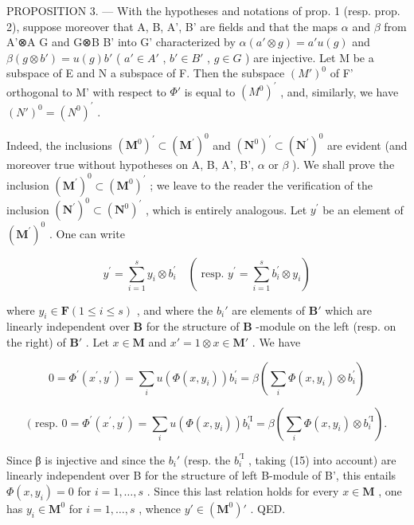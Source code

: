 PROPOSITION 3. --- With the hypotheses and notations of prop. 1 (resp. prop. 2), suppose moreover that A, B, A', B' are fields and that the maps \(\alpha\) and \(\beta\) from A'⊗A G and G⊗B B' into G' characterized by \(\alpha(a'\otimes g)=a'u(g)\) and \(\beta(g\otimes b')=u(g)b'\) ( \(a'\in A'\) , \(b'\in B'\) , \(g\in G\) ) are injective. Let M be a subspace of E and N a subspace of F. Then the subspace \((M')^{0}\) of F' orthogonal to M' with respect to \(\Phi'\) is equal to \((M^{0})^{\prime}\) , and, similarly, we have \((N')^{0} = (N^{0})^{\prime}\) .

Indeed, the inclusions \((\mathbf{M}^{0})^{\prime}\subset(\mathbf{M}^{\prime})^{0}\) and \((\mathbf{N}^{0})^{\prime}\subset(\mathbf{N}^{\prime})^{0}\) are evident (and moreover true without hypotheses on A, B, A', B', \(\alpha\) or \(\beta\) ). We shall prove the inclusion \((\mathbf{M}^{\prime})^{0}\subset(\mathbf{M}^{0})^{\prime}\) ; we leave to the reader the verification of the inclusion \((\mathbf{N}^{\prime})^{0}\subset(\mathbf{N}^{0})^{\prime}\) , which is entirely analogous. Let \(y^{\prime}\) be an element of \((\mathbf{M}^{\prime})^{0}\) . One can write

\[
y ^ {\prime} = \sum_ {i = 1} ^ {s} y _ {i} \otimes b _ {i} ^ {\prime} \quad (\text { resp. } y ^ {\prime} = \sum_ {i = 1} ^ {s} b _ {i} ^ {\prime} \otimes y _ {i})
\]

where \(y_i \in \mathbf{F} (1 \leqslant i \leqslant s)\) , and where the \(b_i'\) are elements of \(\mathbf{B}'\) which are linearly independent over \(\mathbf{B}\) for the structure of \(\mathbf{B}\) -module on the left (resp. on the right) of \(\mathbf{B}'\) . Let \(x \in \mathbf{M}\) and \(x' = 1 \otimes x \in \mathbf{M}'\) . We have

\[
0 = \Phi^ {\prime} (x ^ {\prime}, y ^ {\prime}) = \sum_ {i} u (\Phi (x, y _ {i})) b _ {i} ^ {\prime} = \beta (\sum_ {i} \Phi (x, y _ {i}) \otimes b _ {i} ^ {\prime})
\]

\[
(\text { resp. } 0 = \Phi^ {\prime} (x ^ {\prime}, y ^ {\prime}) = \sum_ {i} u (\Phi (x, y _ {i})) b _ {i} ^ {\prime \mathrm{I}} = \beta (\sum_ {i} \Phi (x, y _ {i}) \otimes b _ {i} ^ {\prime \mathrm{I}}).
\]

Since β is injective and since the \(b_i'\) (resp. the \(b _ {i} ^ {\prime \mathrm{I}}\) , taking (15) into account) are linearly independent over B for the structure of left B-module of B', this entails \(\Phi(x, y_i) = 0\) for \(i = 1, \ldots, s\) . Since this last relation holds for every \(x \in \mathbf{M}\) , one has \(y_i \in \mathbf{M}^0\) for \(i = 1, \ldots, s\) , whence \(y' \in (\mathbf{M}^0)'\) . QED.

